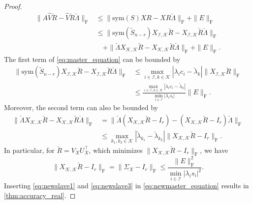 \documentclass[10pt,twoside,dvipsnames]{siamart1116}
\numberwithin{algorithm}{section}
\numberwithin{equation}{section}
\begin{document}
\begin{proof}
\begin{align}
\nonumber
	\|A\widehat{V}\breve{R}-\widehat{V}\breve{R}\breve{\Lambda}\|_\mathrm{F}&\leq\|\mathrm{sym}(S)XR-XR\breve{\Lambda}\|_\mathrm{F}+\|E\|_\mathrm{F}\\
	\label{eq:newmaster_equation}
	&\leq \|\mathrm{sym}(\widetilde{S}_{n-r})X_{\mathcal{I},\mathcal{K}}\breve{R}-X_{\mathcal{I},\mathcal{K}}\breve{R}\breve{\Lambda}\|_\mathrm{F}\\
	\nonumber
	&\quad +\|\breve{\Lambda}X_{\mathcal{K},\mathcal{K}}\breve{R}-X_{\mathcal{K},\mathcal{K}}\breve{R}\breve{\Lambda}\|_\mathrm{F}+\|E\|_\mathrm{F}.
\end{align}
The first term of \eqref{eq:master_equation} can be bounded by
\begin{align}
\nonumber
	\|\mathrm{sym}(\widetilde{S}_{n-r})X_{\mathcal{I},\mathcal{K}}\breve{R}-X_{\mathcal{I},\mathcal{K}}\breve{R}\breve{\Lambda}\|_\mathrm{F}&\leq  \max_{i\in\mathcal{I},k\in\mathcal{K}}|\lambda_i c_i-\breve{\lambda}_k|\|X_{\mathcal{I},\mathcal{K}}\breve{R}\|_\mathrm{F}\\
	\label{eq:newslave1}
	&\leq \frac{\max_{i\in\mathcal{I},k\in\mathcal{K}}|\lambda_i c_i-\breve{\lambda}_k|}{\min_{i\in\mathcal{I}}|\lambda_i s_i|}\|E\|_\mathrm{F}.
\end{align}
Moreover, the second term can also be bounded by
\begin{align}
\nonumber
\|\breve{\Lambda}X_{\mathcal{K},\mathcal{K}}\breve{R}-X_{\mathcal{K},\mathcal{K}}\breve{R}\breve{\Lambda}\|_\mathrm{F}&= \|\breve{\Lambda}(X_{\mathcal{K},\mathcal{K}}\breve{R}-I_{r})-(X_{\mathcal{K},\mathcal{K}}\breve{R}-I_{r})\breve{\Lambda}\|_\mathrm{F}\\
\nonumber%
&\leq  \max_{k_1,k_2\in\mathcal{K}}|\breve{\lambda}_{k_1}-\breve{\lambda}_{k_2}|\|X_{\mathcal{K},\mathcal{K}}\breve{R}-I_{r}\|_\mathrm{F}.
\end{align}
In particular, for $\breve{R}=V_X U_X^\top$, which minimizes $\|X_{\mathcal{K},\mathcal{K}}\breve{R}-I_{r}\|_\mathrm{F}$, we have 
\begin{equation}\label{eq:newslave3}
\|X_{\mathcal{K},\mathcal{K}}\breve{R}-I_{r}\|_\mathrm{F}=\|\Sigma_X-I_{r}\|_\mathrm{F}\leq \frac{\|E\|_\mathrm{F}^2}{\min_{i\in\mathcal{I}}|\lambda_i s_i|^2}.  
\end{equation}
Inserting \eqref{eq:newslave1} and \eqref{eq:newslave3} in \eqref{eq:newmaster_equation} results in \cref{thm:accuracy_real}.
\end{proof}
\end{document}
